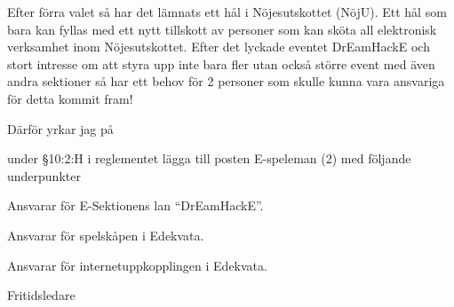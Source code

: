 \documentclass[../_main/handlingar.tex]{subfiles}
\begin{document}
Efter förra valet så har det lämnats ett hål i Nöjesutskottet (NöjU). Ett hål som bara kan fyllas
med ett nytt tillskott av personer som kan sköta all elektronisk verksamhet inom
Nöjesutskottet.
Efter det lyckade eventet DrEamHackE och stort intresse om att styra upp inte bara fler utan
också större event med även andra sektioner så har ett behov för 2 personer som skulle kunna
vara ansvariga för detta kommit fram! 

Därför yrkar jag på
\begin{attsatser}
    \att under \S10:2:H i reglementet lägga till posten E-speleman (2) med följande underpunkter
    \begin{itemizedash}
            \item Ansvarar för E-Sektionens lan ``DrEamHackE''.
            \item Ansvarar för spelskåpen i Edekvata.
            \item Ansvarar för internetuppkopplingen i Edekvata.
     \end{itemizedash}
\end{attsatser}


\begin{signatures}{1}
    \mvh
    \signature{Henrik Ramström}{Fritidsledare}
\end{signatures}
\end{document}
